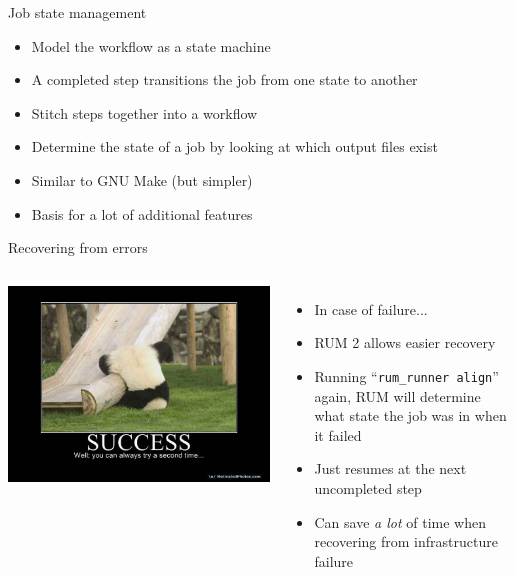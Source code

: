 \documentclass{beamer}
\begin{document}
\begin{frame}{Job state management}
  \begin{itemize}
  \item Model the workflow as a state machine
  \item A completed step transitions the job from one state to another
  \item Stitch steps together into a workflow
  \item Determine the state of a job by looking at which output
    files exist
  \item Similar to GNU Make (but simpler)
  \item Basis for a lot of additional features
  \end{itemize}
\end{frame}

\begin{frame}{Recovering from errors}
  \begin{columns}[c]
    \column{2in}
    \includegraphics[scale=0.2]{success.jpg}
    \column{2.5in}
    \begin{itemize}

    \item In case of failure...

    \item RUM 2 allows easier recovery

    \item Running ``\texttt{rum\_runner align}'' again, RUM will determine what state the job was in when it failed

    \item Just resumes at the next uncompleted step

    \item Can save \textit{a lot} of time when recovering from infrastructure failure

    \end{itemize}

  \end{columns}
\end{frame}
\end{document}
